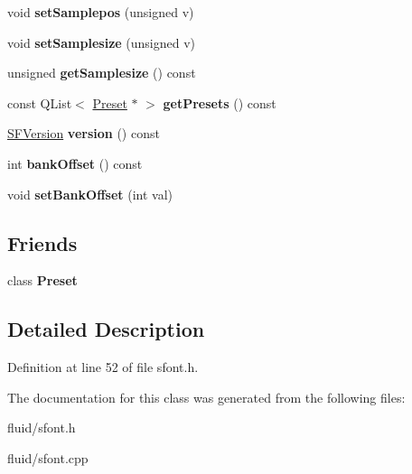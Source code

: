 \begin{DoxyCompactItemize}
\mbox{\label{class_fluid_s_1_1_s_font_a503483eeac66519fab8e9c7024ab4299}} 
void {\bfseries set\+Samplepos} (unsigned v)
\item 
\mbox{\label{class_fluid_s_1_1_s_font_af619446887d8c2240085ab21f27da718}} 
void {\bfseries set\+Samplesize} (unsigned v)
\item 
\mbox{\label{class_fluid_s_1_1_s_font_aa37d105f3ca050334b1717a2085db92e}} 
unsigned {\bfseries get\+Samplesize} () const
\item 
\mbox{\label{class_fluid_s_1_1_s_font_a43dc921ebc86ac9a7174042365326609}} 
const Q\+List$<$ \hyperlink{class_fluid_s_1_1_preset}{Preset} $\ast$ $>$ {\bfseries get\+Presets} () const
\item 
\mbox{\label{class_fluid_s_1_1_s_font_a0803b527150dea0967b6be1ac74e814d}} 
\hyperlink{struct_fluid_s_1_1_s_f_version}{S\+F\+Version} {\bfseries version} () const
\item 
\mbox{\label{class_fluid_s_1_1_s_font_a4cf6ec6fb4139dc323e5ad5b2df550ce}} 
int {\bfseries bank\+Offset} () const
\item 
\mbox{\label{class_fluid_s_1_1_s_font_ab98e629d51e621a04a3bd7c2cd399f02}} 
void {\bfseries set\+Bank\+Offset} (int val)
\end{DoxyCompactItemize}
\subsection*{Friends}
\begin{DoxyCompactItemize}
\item 
\mbox{\label{class_fluid_s_1_1_s_font_ad3f56d18622fd9af0064d524c0b50d7a}} 
class {\bfseries Preset}
\end{DoxyCompactItemize}


\subsection{Detailed Description}


Definition at line 52 of file sfont.\+h.



The documentation for this class was generated from the following files\+:\begin{DoxyCompactItemize}
\item 
fluid/sfont.\+h\item 
fluid/sfont.\+cpp\end{DoxyCompactItemize}
